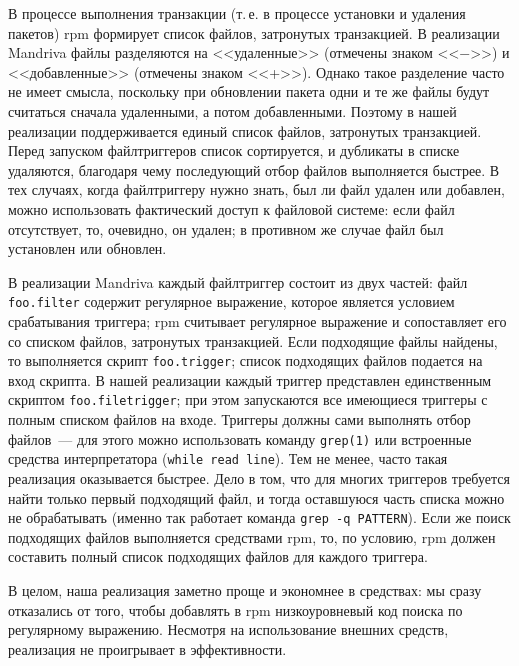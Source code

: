\documentclass[russian,a4paper,12pt,titlepage]{article}
\begin{document}
В процессе выполнения транзакции (т.\,е. в процессе установки и удаления пакетов) rpm формирует список файлов, затронутых транзакцией.
В реализации Mandriva файлы разделяются на <<удаленные>> (отмечены знаком <<$-$>>) и <<добавленные>> (отмечены знаком <<+>>).
Однако такое разделение часто не имеет смысла, поскольку при обновлении пакета одни и те же файлы будут считаться сначала удаленными,
а потом добавленными.  Поэтому в нашей реализации поддерживается единый список файлов, затронутых транзакцией.  Перед запуском файлтриггеров
список сортируется, и дубликаты в списке удаляются, благодаря чему последующий отбор файлов выполняется быстрее.  В тех случаях,
когда файлтриггеру нужно знать, был ли файл удален или добавлен, можно использовать фактический доступ к файловой системе: если файл
отсутствует, то, очевидно, он удален; в противном же случае файл был установлен или обновлен.

В реализации Mandriva каждый файлтриггер состоит из двух частей: файл \verb|foo.filter| содержит регулярное выражение, которое является
условием срабатывания триггера; rpm считывает регулярное выражение и сопоставляет его со списком файлов, затронутых транзакцией.
Если подходящие файлы найдены, то выполняется скрипт \verb|foo.trigger|; список подходящих файлов подается на вход скрипта.
В нашей реализации каждый триггер представлен единственным скриптом \verb|foo.filetrigger|; при этом запускаются все имеющиеся триггеры
с полным списком файлов на входе.  Триггеры должны сами выполнять
отбор файлов~--- для этого можно использовать команду \verb|grep(1)| или встроенные средства интерпретатора (\texttt{while read line}).
Тем не менее, часто такая реализация оказывается быстрее.  Дело в том, что для многих триггеров требуется найти только
первый подходящий файл, и тогда оставшуюся часть списка можно не обрабатывать (именно так работает команда \verb|grep -q PATTERN|).
Если же поиск подходящих файлов выполняется средствами rpm, то, по условию, rpm должен составить полный список подходящих
файлов для каждого триггера.

В целом, наша реализация заметно проще и экономнее в средствах: мы сразу отказались от того, чтобы добавлять в rpm низкоуровневый
код поиска по регулярному выражению.  Несмотря на использование внешних средств, реализация не проигрывает в эффективности.
\end{document}
